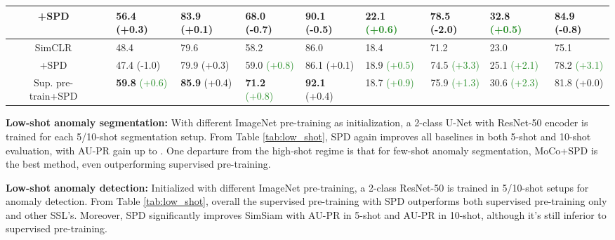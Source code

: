 \documentclass[runningheads]{llncs}
\newcommand{\cmark}{\ding{51}}\newcommand{\xmark}{\ding{55}}\usepackage[colorlinks]{hyperref}
\begin{document}
\begin{table*}[!t]
{\begin{tabular}{c|c|llll||llll}
    +SPD               &   \xmark                                                                         & 56.4 (+0.3) & \multicolumn{1}{l|}{83.9 (+0.1)} & 68.0 (-0.7)   & 90.1 (-0.5)  & \textbf{22.1} \textcolor{forestgreen}{(+0.6)} & \multicolumn{1}{l|}{78.5 (-2.0)} & \textbf{32.8} \textcolor{forestgreen}{(+0.5)}  & 84.9 (-0.8)  \\ \hline 
    SimCLR             &  \xmark                                                                          & 48.4        & \multicolumn{1}{l|}{79.6}        & 58.2          & 86.0         & 18.4        & \multicolumn{1}{l|}{71.2}        & 23.0         & 75.1         \\
    +SPD               &  \xmark                                                                         & 47.4 (-1.0) & \multicolumn{1}{l|}{79.9 (+0.3)} & 59.0 \textcolor{forestgreen}{(+0.8)}   & 86.1 (+0.1)  & 18.9 \textcolor{forestgreen}{(+0.5)} & \multicolumn{1}{c|}{74.5 \textcolor{forestgreen}{(+3.3)}} & 25.1 \textcolor{forestgreen}{(+2.1)}  & 78.2 \textcolor{forestgreen}{(+3.1)}  \\ \hline
    Sup. pre-train+SPD &  \cmark                                                                          &    \textbf{59.8} \textcolor{forestgreen}{(+0.6)}         & \multicolumn{1}{l|}{\textbf{85.9} (+0.4)}            &         \textbf{71.2} \textcolor{forestgreen}{(+0.8)}      &   \textbf{92.1} (+0.4)          & 18.7 \textcolor{forestgreen}{(+0.9)} & \multicolumn{1}{c|}{75.9 \textcolor{forestgreen}{(+1.3)}} & 30.6 \textcolor{forestgreen}{(+2.3)}  & 81.8 (+0.0)  \\ \hline
    \end{tabular}}
\end{table*}

\noindent\textbf{Low-shot anomaly segmentation:} With different ImageNet pre-training as initialization, a 2-class U-Net with ResNet-50 encoder is trained for each 5/10-shot segmentation setup. From Table \ref{tab:low_shot}, SPD again improves all baselines in both 5-shot and 10-shot evaluation, with AU-PR gain up to . One departure from the high-shot regime is that for few-shot anomaly segmentation, MoCo+SPD is the best method, even outperforming supervised pre-training.   

\noindent\textbf{Low-shot anomaly detection:} Initialized with different ImageNet pre-training, a 2-class ResNet-50 is trained in 5/10-shot setups for anomaly detection. From Table \ref{tab:low_shot}, overall the supervised pre-training with SPD outperforms both supervised pre-training only and other SSL's. Moreover, SPD significantly improves SimSiam with  AU-PR in 5-shot and  AU-PR in 10-shot, although it's still inferior to supervised pre-training.
\end{document}
